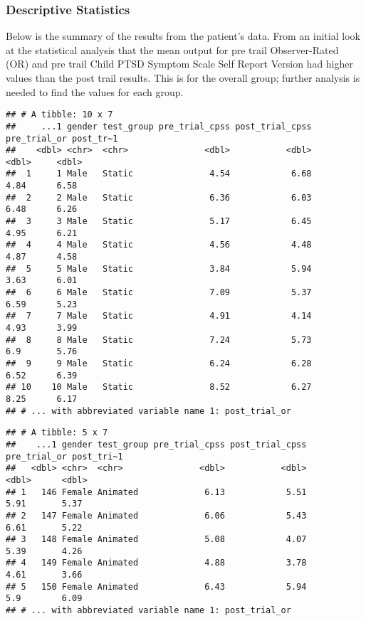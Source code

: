 \documentclass[
]{article}
\begin{document}
\hypertarget{descriptive-statistics}{%
\subsubsection{\texorpdfstring{\textbf{Descriptive
Statistics}}{Descriptive Statistics}}\label{descriptive-statistics}}

Below is the summary of the results from the patient's data. From an
initial look at the statistical analysis that the mean output for pre
trail Observer-Rated (OR) and pre trail Child PTSD Symptom Scale Self
Report Version had higher values than the post trail results. This is
for the overall group; further analysis is needed to find the values for
each group.

\begin{verbatim}
## # A tibble: 10 x 7
##     ...1 gender test_group pre_trial_cpss post_trial_cpss pre_trial_or post_tr~1
##    <dbl> <chr>  <chr>               <dbl>           <dbl>        <dbl>     <dbl>
##  1     1 Male   Static               4.54            6.68         4.84      6.58
##  2     2 Male   Static               6.36            6.03         6.48      6.26
##  3     3 Male   Static               5.17            6.45         4.95      6.21
##  4     4 Male   Static               4.56            4.48         4.87      4.58
##  5     5 Male   Static               3.84            5.94         3.63      6.01
##  6     6 Male   Static               7.09            5.37         6.59      5.23
##  7     7 Male   Static               4.91            4.14         4.93      3.99
##  8     8 Male   Static               7.24            5.73         6.9       5.76
##  9     9 Male   Static               6.24            6.28         6.52      6.39
## 10    10 Male   Static               8.52            6.27         8.25      6.17
## # ... with abbreviated variable name 1: post_trial_or
\end{verbatim}

\begin{verbatim}
## # A tibble: 5 x 7
##    ...1 gender test_group pre_trial_cpss post_trial_cpss pre_trial_or post_tri~1
##   <dbl> <chr>  <chr>               <dbl>           <dbl>        <dbl>      <dbl>
## 1   146 Female Animated             6.13            5.51         5.91       5.37
## 2   147 Female Animated             6.06            5.43         6.61       5.22
## 3   148 Female Animated             5.08            4.07         5.39       4.26
## 4   149 Female Animated             4.88            3.78         4.61       3.66
## 5   150 Female Animated             6.43            5.94         5.9        6.09
## # ... with abbreviated variable name 1: post_trial_or
\end{verbatim}
\end{document}
